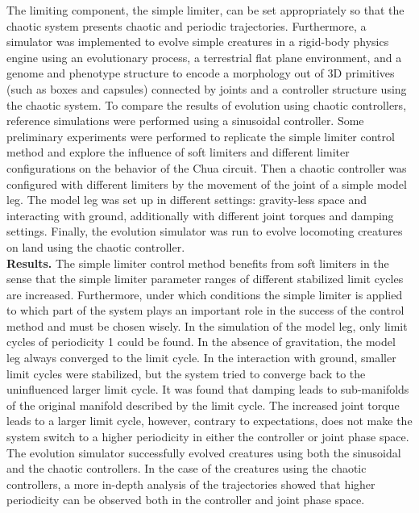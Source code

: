 \documentclass[11pt, a4paper, oneside]{Thesis} %
\begin{document}
{%
The limiting component, the simple limiter, can be set appropriately so that the chaotic system presents chaotic and periodic trajectories. %
%
Furthermore, a simulator was implemented to evolve simple creatures in a rigid-body physics engine using an evolutionary process, a terrestrial flat plane environment, and a genome and phenotype structure to encode a morphology out of 3D primitives (such as boxes and capsules) connected by joints and a controller structure using the chaotic system. %
%
To compare the results of evolution using chaotic controllers, reference simulations were performed using a sinusoidal controller. %
%
Some preliminary experiments were performed to replicate the simple limiter control method and explore the influence of soft limiters and different limiter configurations on the behavior of the Chua circuit. %
%
Then a chaotic controller was configured with different limiters by the movement of the joint of a simple model leg. %
%
The model leg was set up in different settings: gravity-less space and interacting with ground, additionally with different joint torques and damping settings. %
%
Finally, the evolution simulator was run to evolve locomoting creatures on land using the chaotic controller. \\
%
%
%
\textbf{Results.} The simple limiter control method benefits from soft limiters in the sense that the simple limiter parameter ranges of different stabilized limit cycles are increased. %
%
Furthermore, under which conditions the simple limiter is applied to which part of the system plays an important role in the success of the control method and must be chosen wisely. %
%
In the simulation of the model leg, only limit cycles of periodicity 1 could be found. In the absence of gravitation, the model leg always converged to the limit cycle. %
%
In the interaction with ground, smaller limit cycles were stabilized, but the system tried to converge back to the uninfluenced larger limit cycle. %
%
It was found that damping leads to sub-manifolds of the original manifold described by the limit cycle. %
%
The increased joint torque leads to a larger limit cycle, however, contrary to expectations, does not make the system switch to a higher periodicity in either the controller or joint phase space. %
%
The evolution simulator successfully evolved creatures using both the sinusoidal and the chaotic controllers. %
%
In the case of the creatures using the chaotic controllers, a more in-depth analysis of the trajectories showed that higher periodicity can be observed both in the controller and joint phase space. %

}
\end{document}
